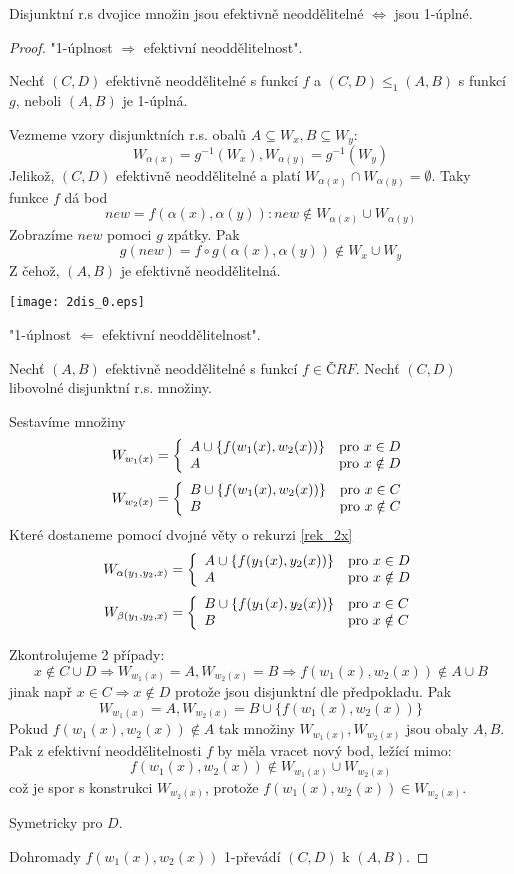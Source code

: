 \begin{theorem}
	Disjunktní r.s dvojice množin jsou efektivně neoddělitelné $\iff$ jsou 1-úplné.
\end{theorem}
\begin{proof}
	"1-úplnost $\Rightarrow$ efektivní neoddělitelnost".

	Nechť $(C, D)$ efektivně neoddělitelné s funkcí $f$ a $(C, D) \leq_1 (A, B)$ s funkcí $g$, neboli $(A, B)$ je 1-úplná.

	Vezmeme vzory disjunktních r.s. obalů $A \subseteq W_x, B \subseteq W_y$:
	\[ W_{\alpha(x)} = g^{-1}(W_x), W_{\alpha(y)} = g^{-1}(W_y) \]
	Jelikož, $(C, D)$ efektivně neoddělitelné a platí $W_{\alpha(x)} \cap W_{\alpha(y)} = \emptyset$.
	Taky funkce $f$ dá bod
	\[ new = f(\alpha(x), \alpha(y)): new \notin W_{\alpha(x)} \cup W_{\alpha(y)} \]
	Zobrazíme $new$ pomoci $g$ zpátky. Pak
	\[ g(new) = f \circ g(\alpha(x), \alpha(y)) \notin W_x \cup W_y\]
	Z čehož, $(A, B)$ je efektivně neoddělitelná.

\texttt{[image: 2dis\_0.eps]}

	"1-úplnost $\Leftarrow$ efektivní neoddělitelnost".

	Nechť $(A, B)$ efektivně neoddělitelné s funkcí $f \in ČRF$.
	Nechť $(C, D)$ libovolné disjunktní r.s. množiny.

	Sestavíme množiny
	\[ W_{w_1(x)} = \left\{ \begin{array}{ll}  A \cup \{ f(w_1(x), w_2(x)) \}  & \mbox{pro }  x \in D  \\  A  & \mbox{pro }  x \notin D  \end{array} \right. \]
	\[ W_{w_2(x)} = \left\{ \begin{array}{ll}  B \cup \{ f(w_1(x), w_2(x)) \}  & \mbox{pro }  x \in C  \\  B  & \mbox{pro }  x \notin C  \end{array} \right. \]
	Které dostaneme pomocí dvojné věty o rekurzi \cref{rek_2x}
	\[ W_{\alpha(y_1, y_2, x)} = \left\{ \begin{array}{ll}  A \cup \{ f(y_1(x), y_2(x)) \}  & \mbox{pro }  x \in D  \\  A  & \mbox{pro }  x \notin D  \end{array} \right. \]
	\[ W_{\beta(y_1, y_2, x)} = \left\{ \begin{array}{ll}  B \cup \{ f(y_1(x), y_2(x)) \}  & \mbox{pro }  x \in C  \\  B  & \mbox{pro }  x \notin C  \end{array} \right. \]


	Zkontrolujeme 2 případy:
	\[ x \notin C \cup D \Rightarrow W_{w_1(x)} = A, W_{w_2(x)} = B \Rightarrow f(w_1(x), w_2(x)) \notin A \cup B \]
	jinak např $x \in C \Rightarrow x \notin D$ protože jsou disjunktní dle předpokladu.
	Pak
	\[ W_{w_1(x)} = A, W_{w_2(x)} = B \cup \{ f(w_1(x), w_2(x)) \} \]
	Pokud $f(w_1(x), w_2(x)) \notin A$ tak množiny $W_{w_1(x)}, W_{w_2(x)}$ jsou obaly $A, B$.
	Pak z efektivní neoddělitelnosti $f$ by měla vracet nový bod, ležící mimo:
	\[ f(w_1(x), w_2(x)) \notin W_{w_1(x)} \cup W_{w_2(x)} \]
	což je spor s konstrukci $W_{w_2(x)}$, protože $f(w_1(x), w_2(x)) \in W_{w_2(x)}$.

	Symetricky pro $D$.

	Dohromady $f(w_1(x), w_2(x))$ 1-převádí $(C, D)$ k $(A, B)$.
\end{proof}

